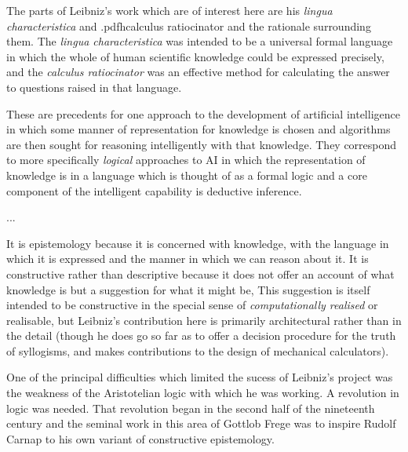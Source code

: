 The parts of Leibniz's work which are of interest here are his
{\it lingua characteristica} and \empftdbook.pdfh{calculus ratiocinator} and the
rationale surrounding them.
The {\it lingua characteristica} was intended to be a universal formal language
in which the whole of human scientific knowledge could be expressed precisely,
and the {\it calculus ratiocinator} was an effective method for calculating
the answer to questions raised in that language.

These are precedents for one approach to the development of artificial intelligence
in which some manner of representation for knowledge is chosen and algorithms
are then sought for reasoning intelligently with that knowledge. 
They correspond to more specifically {\it logical} approaches to AI
in which the representation of knowledge is in a language which is thought
of as a formal logic and a core component of the intelligent capability is
deductive inference.

...

It is epistemology because it is concerned with knowledge, with the language
in which it is expressed and the manner in which we can reason about it.
It is constructive rather than descriptive because it does not offer an account
of what knowledge is but a suggestion for what it might be,
This suggestion is itself intended to be constructive in the special sense
of {\it computationally realised} or realisable, but Leibniz's contribution here is
primarily architectural rather than in the detail (though he does go so far as to
offer a decision procedure for the truth of syllogisms, and makes contributions
to the design of mechanical calculators).

One of the principal difficulties which limited the sucess of Leibniz's project
was the weakness of the Aristotelian logic with which he was working.
A revolution in logic was needed.
That revolution began in the second half of the nineteenth century and the seminal
work in this area of Gottlob Frege was to inspire Rudolf Carnap to his own
variant of constructive epistemology.

